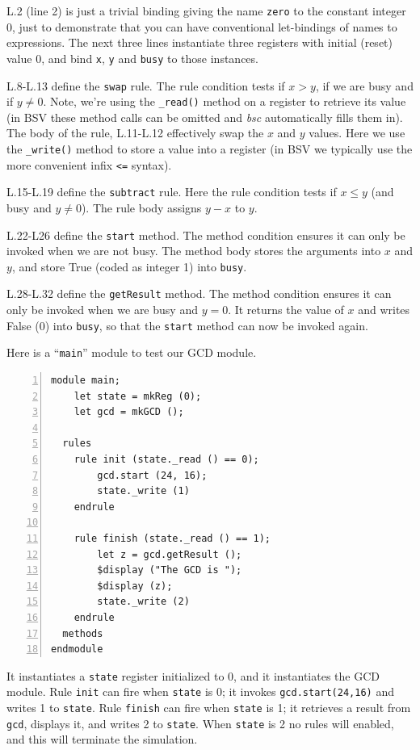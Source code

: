 \documentclass[11pt]{article}
\newcommand{\term}[1]{\texttt{#1}}
\begin{document}
L.2 (line 2) is just a trivial binding giving the name \term{zero} to
the constant integer 0, just to demonstrate that you can have
conventional let-bindings of names to expressions.  The next three
lines instantiate three registers with initial (reset) value 0, and
bind \term{x}, \term{y} and \term{busy} to those instances.

L.8-L.13 define the \term{swap} rule.  The rule condition tests if
$x>y$, if we are busy and if $y\neq 0$.  Note, we're using the
\verb|_read()| method on a register to retrieve its value (in BSV
these method calls can be omitted and \emph{bsc} automatically fills
them in).  The body of the rule, L.11-L.12 effectively swap the $x$
and $y$ values.  Here we use the \verb|_write()| method to store a
value into a register (in BSV we typically use the more convenient
infix \verb|<=| syntax).

L.15-L.19 define the \term{subtract} rule. Here the rule condition
tests if $x\leq y$ (and busy and $y\neq 0$).  The rule body assigns
$y-x$ to $y$.

L.22-L26 define the \term{start} method.  The method condition ensures
it can only be invoked when we are not busy.  The method body stores
the arguments into $x$ and $y$, and store True (coded as integer 1)
into \term{busy}.

L.28-L.32 define the \term{getResult} method. The method condition
ensures it can only be invoked when we are busy and $y=0$.  It returns
the value of $x$ and writes False (0) into \term{busy}, so that the
\term{start} method can now be invoked again.

Here is a ``\term{main}'' module to test our GCD module.

\begin{Verbatim}[frame=single, numbers=left, commandchars=\\\{\}]
module main;
    let state = mkReg (0);
    let gcd = mkGCD ();

  rules
    rule init (state._read () == 0);
        gcd.start (24, 16);
        state._write (1)
    endrule

    rule finish (state._read () == 1);
        let z = gcd.getResult ();
        $display ("The GCD is ");
        $display (z);
        state._write (2)
    endrule
  methods
endmodule
\end{Verbatim}

It instantiates a \term{state} register initialized to 0, and it
instantiates the GCD module.  Rule \term{init} can fire when
\term{state} is 0; it invokes \term{gcd.start(24,16)} and writes 1 to
\term{state}.  Rule \term{finish} can fire when \term{state} is 1; it
retrieves a result from \term{gcd}, displays it, and writes 2 to
\term{state}.  When \term{state} is 2 no rules will enabled, and this
will terminate the simulation.
\end{document}

